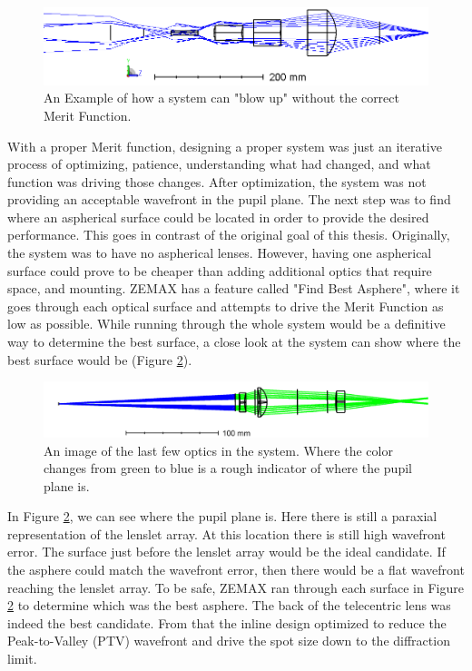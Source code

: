 \begin{figure}[h!]
\centering
\includegraphics[width=14cm]{Figures/wo_merit_function.png}
\caption{An Example of how a system can "blow up" without the correct Merit Function.}
\label{fig:wo_merit}
\end{figure}

With a proper Merit function, designing a proper system was just an iterative
process of optimizing, patience, understanding what had changed, and what function
was driving those changes.  After optimization, the system was not providing an
acceptable wavefront in the pupil plane.  The next step was to find where an aspherical
surface could be located in order to provide the desired performance.  This goes in
contrast of the original goal of this thesis.  Originally, the system was to have no
aspherical lenses.  However, having one aspherical surface could prove to be cheaper than
adding additional optics that require space, and mounting.  ZEMAX has a feature called
"Find Best Asphere", where it goes through each optical surface and attempts to drive the
Merit Function as low as possible.  While running through the whole system would be a
definitive way to determine the best surface, a close look at the system can show where the
best surface would be (Figure \ref{fig:good_pupil}).


\begin{figure}[h!]
\centering
\includegraphics[width=14cm]{Figures/good_pupil.png}
\caption{An image of the last few optics in the system.  Where the color changes from green to blue is a rough indicator of where the pupil plane is.}
\label{fig:good_pupil}
\end{figure}

In Figure \ref{fig:good_pupil}, we can see where the pupil plane is.  Here there is
still a paraxial representation of the lenslet array.  At this location there is
still high wavefront error.  The surface just before the lenslet array would be the
ideal candidate.  If the asphere could match the wavefront error, then there would
be a flat wavefront reaching the lenslet array.  To be safe, ZEMAX ran through each
surface in Figure \ref{fig:good_pupil} to determine which was the best asphere.  The
back of the telecentric lens was indeed the best candidate.  From that the inline
design optimized to reduce the Peak-to-Valley (PTV) wavefront and drive the spot
size down to the diffraction limit.


